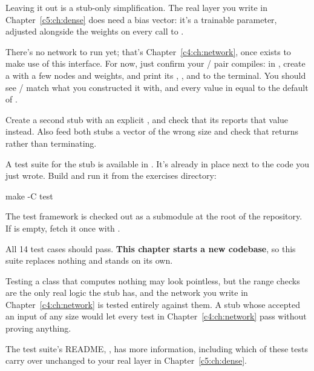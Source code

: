 \note[Note!] Leaving it out is a stub-only simplification. The real  layer you write in
Chapter~\ref{c5:ch:dense} does need a bias vector: it's a trainable parameter, adjusted alongside the
weights on every call to .

\label{c3:ex:6}
There's no network to run yet; that's Chapter~\ref{c4:ch:network}, once
 exists to make use of this interface. For now, just confirm your
/ pair compiles: in , create a 
with a few nodes and weights, and print its , , and
 to the terminal. You should see / match what
you constructed it with, and every value in  equal to the default 
of .

Create a second stub with an explicit , and check that its  reports
that value instead. Also feed both stubs a vector of the wrong size and check that
 returns  rather than terminating.

\label{c3:ex:7}
A test suite for the stub is available in . It's already
in place next to the code you just wrote. Build and run it from the exercises directory:

\begin{shell}
make -C test
\end{shell}

\noindent The test framework is checked out as a submodule at the root of the repository. If
 is empty, fetch it once with .

All 14 test cases should pass. \textbf{This chapter starts a new  codebase}, so this suite
replaces nothing and stands on its own.

Testing a class that computes nothing may look pointless, but the range checks are the only real
logic the stub has, and the network you write in Chapter~\ref{c4:ch:network} is tested entirely
against them. A stub whose  accepted an input of any size would let every test
in Chapter~\ref{c4:ch:network} pass without proving anything.

The test suite's README, , has more
information, including which of these tests carry over unchanged to your real  layer in
Chapter~\ref{c5:ch:dense}.
